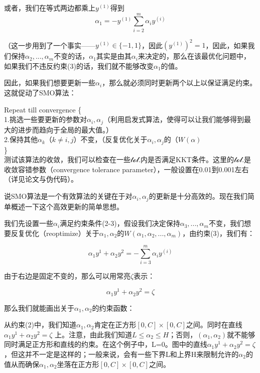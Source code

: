 \documentclass[UTF8]{ctexart}
\begin{document}
或者，我们在等式两边都乘上$y^{(1)}$得到\[ \alpha_{1} = - y^{(1)}\sum_{i=2}^{m}\alpha_{i}y^{(i)} \]

（这一步用到了一个事实——$y^{(1)} \in \{-1,1\}$，因此$(y^{(1)})^{2} = 1$，因此，如果我们保持$\alpha_{2},...,\alpha_{m}$不变的话，$\alpha_{1}$其实是由其$\alpha_{i}$来决定的，那么在该最优化问题中，如果我们不违反约束(3)的话，我们就不能够改变$\alpha_{1}$的值。

因此，如果我们想要更新一些$\alpha_{i}$，那么就必须同时更新两个以上以保证满足约束。这就促动了SMO算法：


Repeat till convergence \{\\
	1.挑选一些要更新的参数对$\alpha_{i},\alpha_{j}$（利用启发式算法，使得可以让我们能够得到最大的进步而趋向于全局的最大值。）\\
	2.保持其他$\alpha_{k}（k \neq i,j）$不变，（反复优化关于$\alpha_{i},\alpha_{j}$的（$W(\alpha)$\\
\}\\

测试该算法的收敛，我们可以检查在一些$\mathcal{tol}.$内是否满足KKT条件。这里的$\mathcal{tol}.$是收敛容错参数（convergence tolerance parameter），一般设置在0.01到0.001左右（详见论文与伪代码）。

说SMO算法是一个有效算法的关键在于对$\alpha_{i},\alpha_{j}$的更新是十分高效的。现在我们简单概述一下这个高效更新的简单思想。

我们先设置一些$\alpha_{i}$满足约束条件(2-3)，假设我们决定保持$\alpha_{3},...,\alpha_{m}$不变，我们想要反复优化（reoptimize）关于$\alpha_{1},\alpha_{2}$的$W(\alpha_{1},\alpha_{2},...,\alpha_{m})$，由约束(3)，我们有：

\[ \alpha_{1}y^{1} + \alpha_{2}y^{2}= - \sum_{i=3}^{m}\alpha_{i}y^{(i)} \] 

由于右边是固定不变的，那么可以用常亮$\zeta$表示：

\[ \alpha_{1}y^{1} + \alpha_{2}y^{2}=\zeta\]

那么我们就能画出关于$\alpha_{1},\alpha_{2}$的约束函数：


\begin{figure}[htb]        
\end{figure}


从约束(2)中，我们知道$\alpha_{1},\alpha_{2}$肯定在正方形$[0,C]\times[0,C]$之间。同时在直线$\alpha_{1}y^{1} + \alpha_{2}y^{2}=\zeta$ 上。注意，由此我们知道$L \leq \alpha_{2} \leq H$；否则，$(\alpha_{1},\alpha_{2})$就不能够同时满足正方形和直线的约束。在这个例子中，L=0。图中的直线$\alpha_{1}y^{1} + \alpha_{2}y^{2}=\zeta$，但这并不一定是这样的；一般来说，会有一些下界L和上界H来限制允许的$\alpha_{2}$的值从而确保$\alpha_{1},\alpha_{2}$坐落在正方形$[0,C]\times[0,C]$之间。
\end{document}
